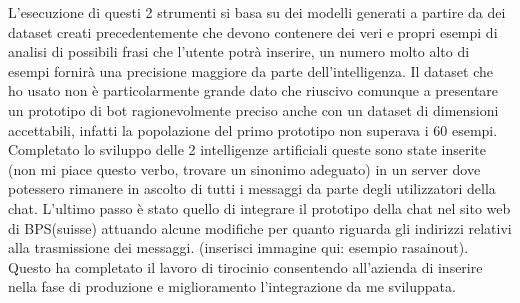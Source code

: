 L'esecuzione di questi 2 strumenti si basa su dei modelli generati a partire da dei dataset creati precedentemente che devono contenere dei veri e propri esempi di analisi di possibili frasi che l'utente potrà inserire, un numero molto alto di esempi fornirà una precisione maggiore da parte dell'intelligenza.
Il dataset che ho usato non è particolarmente grande dato che riuscivo comunque a presentare un prototipo di bot ragionevolmente preciso anche con un dataset di dimensioni accettabili, infatti la popolazione del primo prototipo non superava i 60 esempi.
Completato lo sviluppo delle 2 intelligenze artificiali queste sono state inserite (non mi piace questo verbo, trovare un sinonimo adeguato) in un server dove potessero rimanere in ascolto di tutti i messaggi da parte degli utilizzatori della chat.
L'ultimo passo è stato quello di integrare il prototipo della chat nel sito web di BPS(suisse) attuando alcune modifiche per quanto riguarda gli indirizzi relativi alla trasmissione dei messaggi.
(inserisci immagine qui: esempio rasainout).
Questo ha completato il lavoro di tirocinio consentendo all'azienda di inserire nella fase di produzione e miglioramento l'integrazione da me sviluppata.

\iffalse
<frase iniziale>
<perchè ho scelto questa tesi>
<perchè edp ha scelto questo percorso>
<che progetto è?>
<spiegazione generica degli elementi fondamentali del progetto>
<definizione di un percorso iniziale>
<spiegazione dell'architettura del software di BPS(swisse)>
<studio della libreria principale usata dal frontend del software>
<studio degli elementi principali per la creazione del frontend ----> chat di testo>
<creazione della chat e test del prototipo usando sia testo che voce>
<studio di una possibile implementazione del backend di nlu>
<perchè è stato scelto di non usare dialogflow>
<passaggio a RASA>
<sviluppo del primo modello usato per il NLU>
<creazione del server rasa>
<refactor chat>
<perfezionamento del modello di NLU>
<integrazione>
<problemi affrontati durante l'integrazione>
<conclusione introduzione>
\fi

